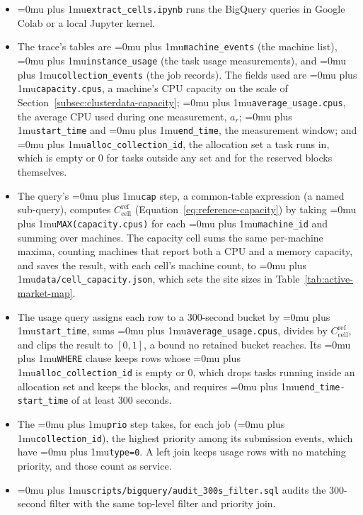 \documentclass{UNCC-thesis}
\newcommand{\codepath}[1]{{\Urlmuskip=0mu plus 1mu\relax\nolinkurl{#1}}}
\begin{document}
\begin{itemize}
  \item \codepath{extract_cells.ipynb} runs the BigQuery queries in
        Google Colab or a local Jupyter kernel.
  \item The trace's tables are \codepath{machine_events} (the machine list),
        \codepath{instance_usage} (the task usage measurements), and
        \codepath{collection_events} (the job records). The fields used are
        \codepath{capacity.cpus}, a machine's CPU capacity on the scale of
        Section~\ref{subsec:clusterdata-capacity};
        \codepath{average_usage.cpus}, the average CPU used during one
        measurement, \(a_r\); \codepath{start_time} and
        \codepath{end_time}, the measurement window; and
        \codepath{alloc_collection_id}, the allocation set a task runs in,
        which is empty or 0 for tasks outside any set and for the reserved
        blocks themselves.
  \item The query's \codepath{cap} step, a common-table expression (a named
        sub-query), computes
        \(C^{\mathrm{ref}}_{\mathrm{cell}}\) (Equation~\eqref{eq:reference-capacity}) by
        taking \codepath{MAX(capacity.cpus)} for each \codepath{machine_id}
        and summing over machines. The capacity cell sums the same
        per-machine maxima, counting machines that report both a CPU and a
        memory capacity, and saves the result, with each cell's machine count, to
        \codepath{data/cell_capacity.json}, which sets the site sizes in
        Table~\ref{tab:active-market-map}.
  \item The usage query assigns each row to a 300-second bucket by
        \codepath{start_time}, sums \codepath{average_usage.cpus}, divides by
        \(C^{\mathrm{ref}}_{\mathrm{cell}}\), and clips the result to \([0,1]\), a bound no
        retained bucket reaches. Its \codepath{WHERE} clause keeps rows whose
        \codepath{alloc_collection_id} is empty or 0, which drops tasks
        running inside an allocation set and keeps the blocks, and requires
        \codepath{end_time-start_time} of at least 300 seconds.
  \item The \codepath{prio} step takes, for each job
        (\codepath{collection_id}), the highest priority among its
        submission events, which have \codepath{type=0}. A left join keeps
        usage rows with no matching priority, and those count as service.
  \item \codepath{scripts/bigquery/audit_300s_filter.sql} audits the
        300-second filter with the same top-level filter and priority join.

\end{itemize}
\end{document}
